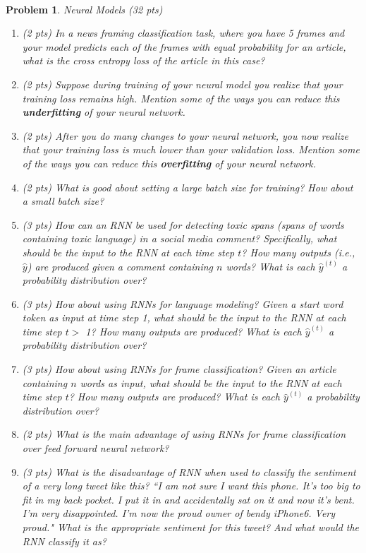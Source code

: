 \documentclass{article}
\newtheorem{problem}{Problem}
\begin{document}
\paragraph{}
\begin{problem} Neural Models (32 pts)
\begin{enumerate}
    \item (2 pts) In a news framing classification task, where you have 5 frames and your model predicts each of the frames with equal probability for an article, what is the cross entropy loss of the article in this case?
    \item (2 pts) Suppose during training of your neural model you realize that your training loss remains high. Mention some of the ways you can reduce this \textbf{underfitting} of your neural network. 
    \item (2 pts) After you do many changes to your neural network, you now realize that your training loss is much lower than your validation loss. Mention some of the ways you can reduce this \textbf{overfitting} of your neural network.
    \item (2 pts) What is good about setting a large batch size for training? How about a small batch size?
    \item (3 pts) How can an RNN be used for detecting toxic spans (spans of words containing toxic language) in a social media comment? Specifically, what should be the input to the RNN at each time step $t$? How many outputs (i.e., $\hat{y}$) are produced given a comment containing $n$ words? What is each $\hat{y}^{(t)}$ a probability distribution over? 
    \item (3 pts) How about using RNNs for language modeling? Given a start word token as input at time step 1, what should be the input to the RNN at each time step $t >$  1? How many outputs are produced? What is each $\hat{y}^{(t)}$ a probability distribution over? 
    \item (3 pts) How about using RNNs for frame classification? Given an article containing $n$ words as input, what should be the input to the RNN at each time step $t$? How many outputs are produced? What is each $\hat{y}^{(t)}$ a probability distribution over?
    \item (2 pts) What is the main advantage of using RNNs for frame classification over feed forward neural network?
    \item (3 pts) What is the disadvantage of RNN when used to classify the sentiment of a very long tweet like this? ``I am not sure I want this phone. It's too big to fit in my back pocket. I put it in and accidentally sat on it and now it's bent. I'm very disappointed. I'm now the proud owner of bendy iPhone6. Very proud." What is the appropriate sentiment for this tweet? And what would the RNN classify it as?

\end{enumerate}
\end{problem}
\end{document}
